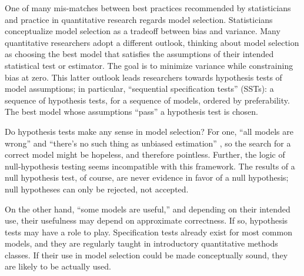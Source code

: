 \documentclass[lineno]{biometrika}\usepackage[]{graphicx}\usepackage[]{color}
\begin{document}
One of many mis-matches between best practices recommended by
statisticians and practice in quantitative research regards model
selection.
Statisticians conceptualize model selection as a tradeoff between bias
and variance.
Many quantitative researchers adopt a different outlook, thinking about model selection as choosing
the best model that satisfies the assumptions of their intended
statistical test or estimator.
The goal is to minimize variance while
constraining bias at zero.
This latter outlook leads researchers towards hypothesis tests of
model assumptions; in particular, ``sequential specification tests'' (SSTs): a sequence of hypothesis tests, for
a sequence of models, ordered by preferability.
The best model whose assumptions ``pass'' a hypothesis test is chosen.

Do hypothesis tests make any sense in model selection?
For one, ``all models are wrong''
\citep[p. 2]{modelsWrong} and ``there's no such thing as unbiased
estimation'' \citep{gelmanBlogUnbiased}, so the search for a correct
model might be hopeless, and therefore pointless.
Further, the logic of null-hypothesis testing seems incompatible
with this framework.
The results of a null hypothesis test, of course, are never evidence
in favor of a null hypothesis; null hypotheses can only be rejected,
not accepted.

On the other hand, ``some models are useful,'' and depending on their
intended use, their usefulness may depend on approximate
correctness.
If so, hypothesis tests may have a role to play.
Specification tests already exist for most common models, and
they are regularly taught in introductory quantitative methods
classes.
If their use in model selection could be made conceptually sound, they
are likely to be actually used.
\end{document}
